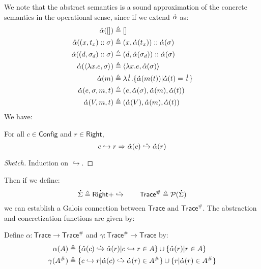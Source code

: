 \documentclass[acmsmall,screen,review]{acmart}\settopmatter{printfolios=true,printccs=false,printacmref=false}
\newcommand*{\cons}{::}
\newcommand*{\pset}{\mathcal{P}}
\newcommand*{\A}[1]{\overset{\,_{\mbox{\Large .}}}{#1}}
\newcommand*{\Abs}[1]{{#1}^{\#}}
\newcommand*{\modid}{d}
\newcommand*{\ctx}{\sigma}
\newcommand*{\mem}{m}
\newcommand*{\Trace}{\mathsf{Trace}}
\newcommand*{\Config}{\mathsf{Config}}
\newcommand*{\config}{c}
\newcommand*{\Right}{\mathsf{Right}}
\newcommand*{\rightst}{r}
\newcommand*{\semarrow}{\hookrightarrow}
\newcommand*{\asemarrow}{\A{\hookrightarrow}}
\begin{document}
We note that the abstract semantics is a sound approximation of the concrete semantics in the operational sense, since if we extend $\A\alpha$ as:
\begin{align*}
  \A\alpha([])                             & \triangleq []                                                  \\
  \A\alpha((x,t_x)\cons \ctx)              & \triangleq(x,\A\alpha(t_x))\cons\A\alpha(\ctx)                 \\
  \A\alpha((\modid,\ctx_\modid)\cons \ctx) & \triangleq(\modid,\A\alpha(\ctx_\modid))\cons\A\alpha(\ctx)    \\
  \A\alpha(\langle\lambda x.e,\ctx\rangle) & \triangleq\langle\lambda x.e,\A\alpha(\ctx)\rangle             \\
  \A\alpha(\mem)                           & \triangleq\lambda\A{t}.\{\A\alpha(\mem(t))|\A\alpha(t)=\A{t}\} \\
  \A\alpha(e,\ctx,\mem,t)                  & \triangleq(e,\A\alpha(\ctx),\A\alpha(\mem),\A\alpha(t))        \\
  \A\alpha(V,\mem,t)                       & \triangleq(\A\alpha(V),\A\alpha(\mem),\A\alpha(t))
\end{align*}
We have:
\begin{lemma}\label{lem:opsound}
  For all $\config\in\Config$ and $\rightst\in\Right$,
  \[\config\semarrow\rightst\Rightarrow\A\alpha(\config)\A\semarrow\A\alpha(\rightst)\]
\end{lemma}
\begin{proof}[Sketch]
  Induction on $\semarrow$.
\end{proof}

Then if we define:
\[\A\Sigma\triangleq\A\Right+\A\semarrow\qquad\Abs{\Trace}\triangleq\pset(\A\Sigma)\]
we can establish a Galois connection between $\Trace$ and $\Abs{\Trace}$.
The abstraction and concretization functions are given by:
\begin{definition}
  Define $\alpha:\Trace\rightarrow\Abs{\Trace}$ and $\gamma:\Abs{\Trace}\rightarrow \Trace$ by:
  \begin{align*}
    \alpha(A)       & \triangleq\{\A\alpha(\config)\asemarrow\A\alpha(\rightst)|\config\semarrow\rightst\in A\}\cup\{\A\alpha(\rightst)|\rightst\in A\}           \\
    \gamma(\Abs{A}) & \triangleq\{\config\semarrow\rightst|\A\alpha(\config)\asemarrow\A\alpha(\rightst)\in\Abs{A}\}\cup\{\rightst|\A\alpha(\rightst)\in\Abs{A}\}
  \end{align*}
\end{definition}
\end{document}
